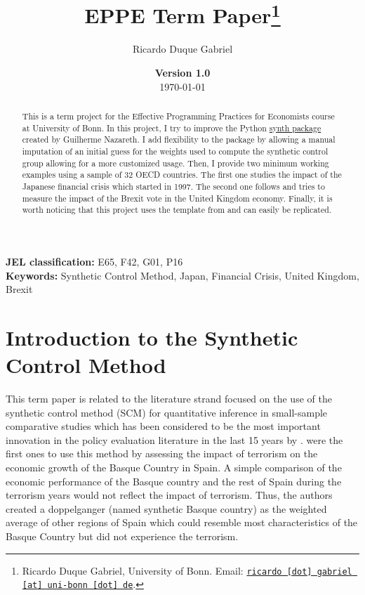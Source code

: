 \documentclass[11pt, a4paper, leqno]{article}
\begin{document}
\title{EPPE Term Paper\thanks{Ricardo Duque Gabriel, University of Bonn. Email: \href{mailto:ricardo.gabriel@uni-bonn.de}{\nolinkurl{ricardo [dot] gabriel [at] uni-bonn [dot] de}}.}}

\author{Ricardo Duque Gabriel}

\date{
{\bf Version 1.0} 
\\[1ex] 
\today
}

\maketitle


\begin{abstract}
	This is a term project for the Effective Programming Practices for Economists course at University of Bonn. In this project, I try to improve the Python \href{https://github.com/gnazareths/synth}{synth package} created by Guilherme Nazareth. I add flexibility to the package by allowing a manual imputation of an initial guess for the weights used to compute the synthetic control group allowing for a more customized usage. Then, I provide two minimum working examples using a sample of 32 OECD countries. The first one studies the impact of the Japanese financial crisis which started in 1997. The second one follows \citet{Born2018} and tries to measure the impact of the Brexit vote in the United Kingdom economy. Finally, it is worth noticing that this project uses the template from \citet{GaudeckerEconProjectTemplates} and can easily be replicated.
\end{abstract}
\vspace{5em}

\textbf{JEL classification:} E65, F42, G01, P16 \\

\textbf{Keywords:} Synthetic Control Method, Japan, Financial Crisis, United Kingdom, Brexit

\clearpage

\section{Introduction to the Synthetic Control Method}
\label{sec: Introduction}

This term paper is related to the literature strand focused on the use of the synthetic control method (SCM) for quantitative inference in small-sample comparative studies which has been considered to be  the most important innovation in the policy evaluation literature in the last 15 years by \citet{Athey2017}. \citet{Abadie2003} were the first ones to use this method by assessing the impact of terrorism on the economic growth of the Basque Country in Spain. A  simple  comparison  of  the  economic  performance  of the Basque country and the rest of Spain during the terrorism years would not reflect the impact of terrorism. Thus, the authors created a doppelganger (named synthetic Basque country) as the weighted average of other regions of Spain which could resemble most characteristics of the Basque Country but did not experience the terrorism. \\
\end{document}
